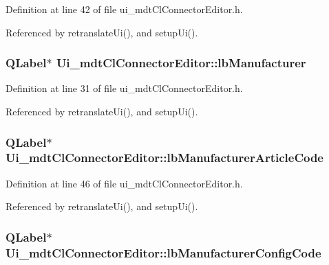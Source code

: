 Definition at line 42 of file ui\-\_\-mdt\-Cl\-Connector\-Editor.\-h.



Referenced by retranslate\-Ui(), and setup\-Ui().

\hypertarget{class_ui__mdt_cl_connector_editor_a55a3b01fb8e019196b4c8300c38ed807}{
\subsubsection[{lb\-Manufacturer}]{\setlength{\rightskip}{0pt plus 5cm}Q\-Label$\ast$ Ui\-\_\-mdt\-Cl\-Connector\-Editor\-::lb\-Manufacturer}}\label{class_ui__mdt_cl_connector_editor_a55a3b01fb8e019196b4c8300c38ed807}


Definition at line 31 of file ui\-\_\-mdt\-Cl\-Connector\-Editor.\-h.



Referenced by retranslate\-Ui(), and setup\-Ui().

\hypertarget{class_ui__mdt_cl_connector_editor_a221eb690e80ed7953fd3a79bbb494e1a}{
\subsubsection[{lb\-Manufacturer\-Article\-Code}]{\setlength{\rightskip}{0pt plus 5cm}Q\-Label$\ast$ Ui\-\_\-mdt\-Cl\-Connector\-Editor\-::lb\-Manufacturer\-Article\-Code}}\label{class_ui__mdt_cl_connector_editor_a221eb690e80ed7953fd3a79bbb494e1a}


Definition at line 46 of file ui\-\_\-mdt\-Cl\-Connector\-Editor.\-h.



Referenced by retranslate\-Ui(), and setup\-Ui().

\hypertarget{class_ui__mdt_cl_connector_editor_a9cf66633ee0cf08a66fa03b4b21d28b4}{
\subsubsection[{lb\-Manufacturer\-Config\-Code}]{\setlength{\rightskip}{0pt plus 5cm}Q\-Label$\ast$ Ui\-\_\-mdt\-Cl\-Connector\-Editor\-::lb\-Manufacturer\-Config\-Code}}\label{class_ui__mdt_cl_connector_editor_a9cf66633ee0cf08a66fa03b4b21d28b4}


